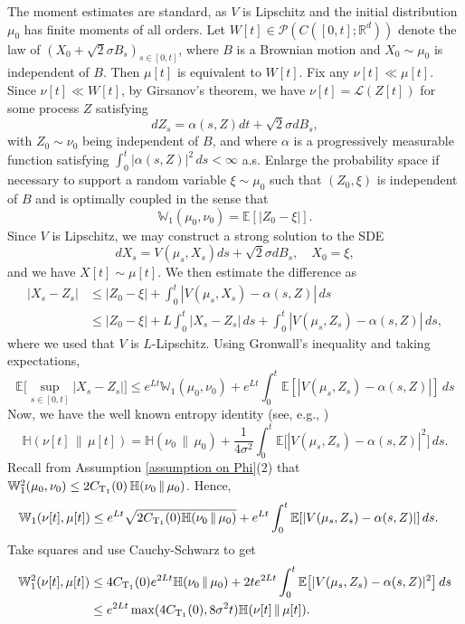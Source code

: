 \documentclass[11pt,reqno]{amsart}
\numberwithin{equation}{section}
\theoremstyle{definition}
\def\E{{\mathbb E}}
\def\R{{\mathbb R}}
\def\Law{\mathcal{L}}
\newcommand{\W}{\mathbb W}
\newcommand{\ent}{ \mathbb H}
\begin{document}
The moment estimates are standard, as $V$ is Lipschitz and the initial distribution $\mu_0$ has finite moments of all orders.
Let $W[t] \in \mathcal P(C([0,t];\R^d))$ denote the law of $(X_0+\sqrt{2}\sigma B_s)_{s \in [0,t]}$, where $B$ is a Brownian motion and $X_0 \sim\mu_0$ is independent of $B$. Then $\mu[t]$ is equivalent to $W[t]$.
Fix any $\nu[t] \ll \mu[t]$. Since $\nu[t] \ll W[t]$, by Girsanov's theorem, we have $\nu[t]=\Law(Z[t])$ for some process $Z$ satisfying
\[
dZ_s = \alpha(s,Z) dt + \sqrt{2} \sigma dB_s,
\]
with $Z_0 \sim \nu_0$ being independent of $B$, and where $\alpha$ is a progressively measurable function satisfying $\int_0^t |\alpha(s,Z)|^2\,ds < \infty$ a.s. Enlarge the probability space if necessary to support a random variable $\xi \sim \mu_0$ such that $(Z_0,\xi)$ is independent of $B$ and is optimally coupled in the sense that 
\[
\W_1(\mu_0,\nu_0) = \E[|Z_0-\xi|].
\]
Since $V$ is Lipschitz, we may construct a strong solution to the SDE
\[
dX_s = V(\mu_s,X_s)ds + \sqrt{2} \sigma dB_s, \quad X_0=\xi,
\]
and we have $X[t] \sim \mu[t]$. We then estimate the difference as
\begin{align*}
|X_s-Z_s| &\le |Z_0-\xi| + \int_0^t|V(\mu_s,X_s)-\alpha(s,Z)|\,ds \\
    &\le |Z_0-\xi| + L\int_0^t|X_s-Z_s|\,ds + \int_0^t|V(\mu_s,Z_s)-\alpha(s,Z)|\,ds ,
\end{align*}
where we used that $V$ is $L$-Lipschitz. Using Gronwall's inequality and taking expectations,
\[
\E\big[\sup_{s \in [0,t]}|X_s-Z_s|\big] \le e^{Lt}\W_1(\mu_0,\nu_0) + e^{Lt}\int_0^t\E[|V(\mu_s,Z_s)-\alpha(s,Z)|]\,ds
\]
Now, we have the well known entropy identity (see, e.g., \cite[Lemma 4.4]{HierarchiesPaper})
\[
\ent(\nu[t]\,\|\,\mu[t]) = \ent(\nu_0\,\|\,\mu_0) + \frac{1}{4\sigma^2}\int_0^t\E\big[|V(\mu_s,Z_s)-\alpha(s,Z)|^2\big]\,ds.
\]
Recall from Assumption \ref{assumption on Phi}(2) that $\W_1^2(\mu_0,\nu_0)\leq 2C_{\textup{T}_1}(0) \,\ent (\nu_0\,\|\,\mu_0)$. Hence,
\begin{align*}
\W_1(\nu[t],\mu[t]) &\le e^{Lt}\sqrt{2C_{\textup{T}_1}(0)\ent (\nu_0\,\|\,\mu_0)}  + e^{Lt}\int_0^t\E[|V(\mu_s,Z_s)-\alpha(s,Z)|]\,ds.
\end{align*}
Take squares and use Cauchy-Schwarz to get
\begin{align*}
\W_1^2(\nu[t],\mu[t]) &\le 4C_{\textup{T}_1}(0)e^{2Lt}\ent (\nu_0\,\|\,\mu_0)  + 2te^{2Lt}\int_0^t\E\big[|V(\mu_s,Z_s)-\alpha(s,Z)|^2\big]\,ds \\
    &\le e^{2Lt}\max(4C_{\textup{T}_1}(0),8\sigma^2 t)\ent(\nu[t]\,\|\,\mu[t]).
\end{align*}
\end{document}
